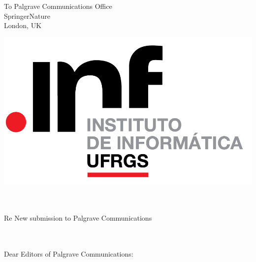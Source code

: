 \documentclass[10pt]{letter} %
\begin{document}






\begin{letter}{To Palgrave Communications Office\\
SpringerNature\\
London, UK
 } 

\includegraphics[scale=0.48]{logo.png}\\ \ \\ \ \\









\opening{Re New submission to Palgrave Communications\\
\\ \ \\}

 Dear Editors of Palgrave Communications: 


\end{letter}
\end{document}
